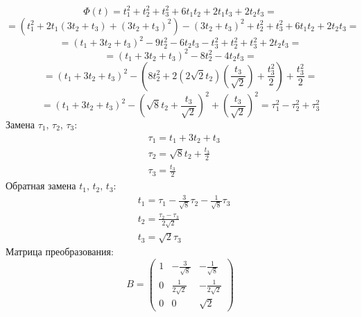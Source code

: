 \documentclass[a4paper,12pt]{article}
\begin{document}
\[
\Phi (t) = t_1^2 + t_2^2 + t_3^2 + 6t_1t_2 + 2t_1t_3 + 2t_2t_3 =
\]
\[
= (t_1^2 + 2t_1(3t_2 + t_3) + (3t_2 + t_3)^2) - (3t_2 + t_3)^2 + t_2^2+ t_3^2+ 6t_1t_2 + 2t_2t_3=
\]
\[
= (t_1 + 3t_2 + t_3)^2 - 9t_2^2 - 6t_2t_3 - t_3^2 + t_2^2 +t_3^2+ 2t_2t_3=
\]
\[
= (t_1 + 3t_2 + t_3)^2 - 8t_2^2 -4t_2t_3=
\]
\[
= (t_1 + 3t_2 + t_3)^2 - (8t_2^2 +2(2\sqrt{2}t_2)(\frac{t_3}{\sqrt{2}})+ \frac{t_3^2}{2})+\frac{t_3^2}{2}=
\]
\[
= (t_1 + 3t_2 + t_3)^2 - (\sqrt{8}t_2 + \frac{t_3}{\sqrt{2}})^2+(\frac{t_3}{\sqrt{2}})^2=\tau_1^2 - \tau_2^2 + \tau_3^2
\]
Замена $\tau_1, \,\tau_2, \,\tau_3$:
\begin{align*}
   &\tau_1 = t_1 + 3t_2 + t_3\\
   &\tau_2 = \sqrt{8}t_2 + \frac{t_3}{2} \\
   &\tau_3 =\frac{t_3}{2}
\end{align*}
Обратная замена $t_1, \,t_2, \,t_3$:
\begin{align*}
   &t_1 = \tau_1 - \frac{3}{\sqrt{8}}\tau_2 -\frac{1}{\sqrt{8}} \tau_3\\
   &t_2 = \frac{\tau_2-\tau_3}{2\sqrt{2}} \\
   &t_3 =\sqrt{2}\tau_3
\end{align*}
Матрица преобразования:
\[
B = 
\begin{pmatrix}
1 & -\frac{3}{\sqrt{8}} & -\frac{1}{\sqrt{8}} \\
0 & \frac{1}{2\sqrt{2}} & -\frac{1}{2\sqrt{2}} \\
0 & 0 & \sqrt{2}
\end{pmatrix}
\]
\end{document}
